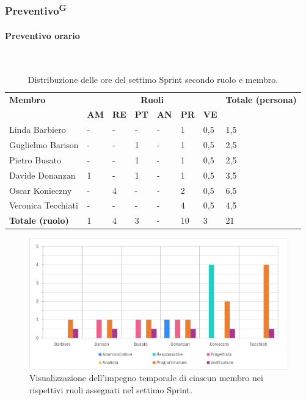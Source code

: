 \documentclass[8pt]{article}
\newcommand{\glossterm}[1]{#1\textsuperscript{G}} %
\newcommand{\subsubsubsection}[1]{\paragraph{#1}\mbox{}\\}
\begin{document}
\subsubsection{\glossterm{Preventivo}}
\subsubsubsection{Preventivo orario}
\begin{table}[ht!]
	\centering
	\begin{tabular}{p{4cm} p{1cm} p{1cm} p{1cm} p{1cm} p{1cm} p{1cm} p{3cm}}
		\toprule
        \textbf{Membro} & \multicolumn{6}{c}{\textbf{Ruoli}} & \textbf{Totale (persona)}\\
		& \textbf{AM} & \textbf{RE} & \textbf{PT} & \textbf{AN} & \textbf{PR} & \textbf{VE}\\
		\midrule
        Linda Barbiero          & -     & -     & -     & -     & 1     & 0,5     & 1,5 \\
        Guglielmo Barison       & -     & -     & 1     & -     & 1     & 0,5     & 2,5 \\
        Pietro Busato           & -     & -     & 1     & -     & 1     & 0,5     & 2,5 \\
        Davide Donanzan         & 1     & -     & 1     & -     & 1     & 0,5     & 3,5 \\
        Oscar Konieczny         & -     & 4     & -     & -     & 2     & 0,5     & 6,5 \\
        Veronica Tecchiati      & -     & -     & -     & -     & 4     & 0,5     & 4,5 \\
        \midrule
        \textbf{Totale (ruolo)} & 1     & 4     & 3    & -    & 10    & 3    & 21 \\
	\bottomrule
	\end{tabular}
	\caption{Distribuzione delle ore del settimo Sprint secondo ruolo e membro.}
	\label{table:Distribuzione delle ore del settimo Sprint secondo ruolo e membro}
\end{table}
\begin{figure}[ht!]
    \centering
    \includegraphics[width=15cm]{./images_pdp/istogramma_periodo_7.png}
    \caption{Visualizzazione dell'impegno temporale di ciascun membro nei rispettivi ruoli assegnati
    nel settimo Sprint.}
    \label{figure:Visualizzazione dell'impegno temporale di ciascun membro nei rispettivi ruoli
    assegnati nel settimo Sprint}
\end{figure}
\end{document}
